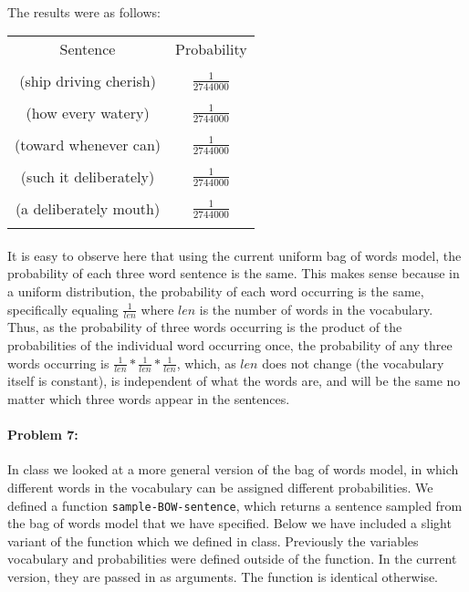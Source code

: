 \documentclass[10pt]{article}
\begin{document}
\paragraph{} The results were as follows:
\begin{center}
    \begin{tabular}{|c|c|}
    \hline
    Sentence & Probability\\ & \\
    \hline
    (ship driving cherish) & $\frac{1}{2744000}$\\ & \\
    \hline
    (how every watery) & $\frac{1}{2744000}$\\ & \\
    \hline
    (toward whenever can) & $\frac{1}{2744000}$\\ & \\
    \hline
    (such it deliberately) & $\frac{1}{2744000}$\\ & \\
    \hline
    (a deliberately mouth) & $\frac{1}{2744000}$\\ & \\
    \hline
    \end{tabular}
\end{center}

\paragraph{}It is easy to observe here that using the current uniform bag of words model, the probability of each three word sentence is the same. This makes sense because in a uniform distribution, the probability of each word occurring is the same, specifically equaling $\frac{1}{len}$ where $len$ is the number of words in the vocabulary. Thus, as the probability of three words occurring is the product of the probabilities of the individual word occurring once, the probability of any three words occurring is $\frac{1}{len} * \frac{1}{len} * \frac{1}{len}$, which, as $len$ does not change (the vocabulary itself is constant), is independent of what the words are, and will be the same no matter which three words appear in the sentences.  

\hrulefill
\paragraph{Problem 7:}

In class we looked at a more general version of the bag of words
model, in which different words in the vocabulary can be assigned
different probabilities. We defined a function \texttt{sample-BOW-sentence},
which returns a sentence sampled from the bag of words model that we
have specified. Below we have included a slight variant of the
function which we defined in class. Previously the variables
vocabulary and probabilities were defined outside of the function. In
the current version, they are passed in as arguments. The function is
identical otherwise.
\end{document}
